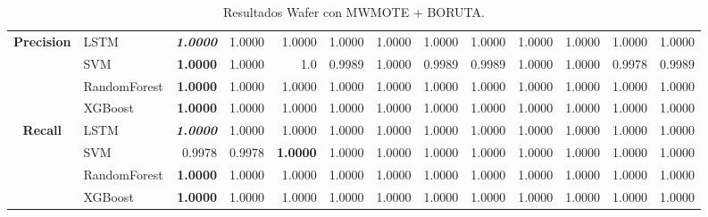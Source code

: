 \begin{table}[H]
\begin{adjustbox}{max width=12cm}
\begin{tabular}{|c|l|r|r|r|r|r|r|r|r|r|r|r|}
			\hline
			\textbf{Precision} &  LSTM & \textit{ \textbf{  1.0000 } } &  1.0000 &  1.0000 &  1.0000 &  1.0000 &  1.0000 &  1.0000 &  1.0000 &  1.0000 &  1.0000 &  1.0000 \\
			&  SVM & \textbf{  1.0000 } &  1.0000 &  1.0 &  0.9989 &  1.0000 &  0.9989 &  0.9989 &  1.0000 &  1.0000 &  0.9978 &  0.9989 \\
			&  RandomForest & \textbf{  1.0000 } &  1.0000 &  1.0000 &  1.0000 &  1.0000 &  1.0000 &  1.0000 &  1.0000 &  1.0000 &  1.0000 &  1.0000 \\
			&  XGBoost & \textbf{  1.0000 } &  1.0000 &  1.0000 &  1.0000 &  1.0000 &  1.0000 &  1.0000 &  1.0000 &  1.0000 &  1.0000 &  1.0000 \\
			\hline
			\textbf{Recall} &  LSTM & \textit{ \textbf{  1.0000 } } &  1.0000 &  1.0000 &  1.0000 &  1.0000 &  1.0000 &  1.0000 &  1.0000 &  1.0000 &  1.0000 &  1.0000 \\
			&  SVM &  0.9978 &  0.9978 & \textbf{  1.0000 } &  1.0000 &  1.0000 &  1.0000 &  1.0000 &  1.0000 &  1.0000 &  1.0000 &  1.0000 \\
			&  RandomForest & \textbf{  1.0000 } &  1.0000 &  1.0000 &  1.0000 &  1.0000 &  1.0000 &  1.0000 &  1.0000 &  1.0000 &  1.0000 &  1.0000 \\
			&  XGBoost & \textbf{  1.0000 } &  1.0000 &  1.0000 &  1.0000 &  1.0000 &  1.0000 &  1.0000 &  1.0000 &  1.0000 &  1.0000 &  1.0000 \\
			\hline
		\end{tabular}
	\end{adjustbox}
	\caption{Resultados Wafer con MWMOTE + BORUTA.}
	\label{tab:Wafer_MWMOTE_BORUTA}
\end{table}

